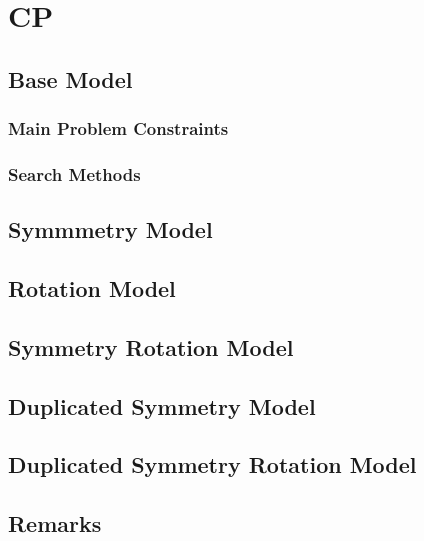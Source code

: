 \chapter{CP}

\section{Base Model}
\subsection{Main Problem Constraints}
\subsection{Search Methods}

\section{Symmmetry Model}
\section{Rotation Model}
\section{Symmetry Rotation Model}
\section{Duplicated Symmetry Model}
\section{Duplicated Symmetry Rotation Model}

\section{Remarks}